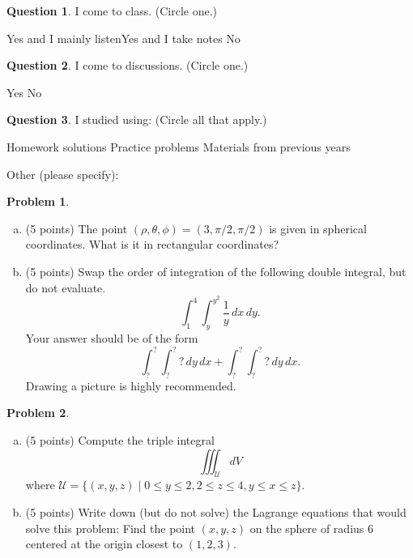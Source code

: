 \documentclass[11pt,oneside]{amsart}
\theoremstyle{definition}
\newtheorem{problem}{Problem}
\newtheorem{question}{Question}
\theoremstyle{plain}
\begin{document}
\begin{question}
  I come to class. (Circle one.)

  \hspace{1.5cm}Yes and I mainly listen\hspace{1.5cm}Yes and I take notes\hspace{1.5cm} No
\end{question}

\begin{question}
  I come to discussions. (Circle one.)

  \hspace{1.5cm}Yes\hspace{1.5cm} No
\end{question}

\begin{question}
  I studied using: (Circle all that apply.)

  \hspace{1.5cm}Homework solutions\hspace{0.05\textwidth} Practice problems\hspace{0.05\textwidth} Materials from previous years

  \hspace{1.5cm}Other (please specify): \underline{\hspace{8cm}}
\end{question}

\newpage

\begin{problem}\leavevmode
  \begin{enumerate}[(a)]
    \item (5 points) The point $(\rho,\theta,\phi)=(3,\pi/2,\pi/2)$ is given in spherical coordinates. What is it in rectangular coordinates?
    \vfill
    \item (5 points) Swap the order of integration of the following double integral, but do not evaluate.
    \[\int_1^4\int_{y}^{y^2}\frac 1y\,dx\,dy.\]
    Your answer should be of the form
    \[\int_{\boxed{?}}^{\boxed{?}}\int_{\boxed{?}}^{\boxed{?}}\boxed{?}\,dy\,dx+\int_{\boxed{?}}^{\boxed{?}}\int_{\boxed{?}}^{\boxed{?}}\boxed{?}\,dy\,dx.\]
    Drawing a picture is highly recommended.
    \vfill
    \vfill
    \vfill
  \end{enumerate}
\end{problem}

\newpage

\begin{problem}\leavevmode
  \begin{enumerate}[(a)]
    \item (5 points) Compute the triple integral
    \[\iiint_{\mathcal U}dV\]
    where $\mathcal U=\{(x,y,z)\mid 0\leq y\leq 2,2\leq z\leq 4, y\leq x\leq z\}$.
    \vfill
    \item (5 points) Write down (but do not solve) the Lagrange equations that would solve this problem: Find the point $(x,y,z)$ on the sphere of radius 6 centered at the origin closest to $(1,2,3)$.
    \vfill
  \end{enumerate}
\end{problem}
\end{document}
